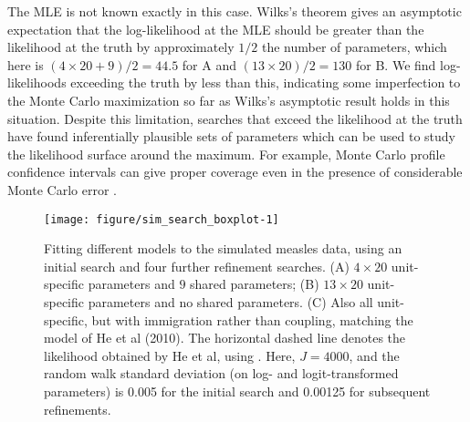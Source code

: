 \documentclass[12pt]{article}\usepackage[]{graphicx}\usepackage[]{xcolor}
\newenvironment{knitrout}{}{} %
\begin{document}
The MLE is not known exactly in this case.
Wilks's theorem gives an asymptotic expectation that the log-likelihood at the MLE should be greater than the likelihood at the truth by approximately $1/2$ the number of parameters, which here is $(4\times 20+9)/2=44.5$ for A and $(13\times 20)/2=130$ for B.
We find log-likelihoods exceeding the truth by less than this, indicating some imperfection to the Monte Carlo maximization so far as Wilks's asymptotic result holds in this situation. 
Despite this limitation, searches that exceed the likelihood at the truth have found inferentially plausible sets of parameters which can be used to study the likelihood surface around the maximum.
For example, Monte Carlo profile confidence intervals can give proper coverage even in the presence of considerable Monte Carlo error \citep{ionides17,ning21}.








\begin{knitrout}
\color{fgcolor}\begin{figure}

\texttt{[image: figure/sim\_search\_boxplot-1]} \hfill{}

\caption[Fitting different models to the simulated measles data, using an initial search and four further refinement searches]{Fitting different models to the simulated measles data, using an initial search and four further refinement searches. (A) $4\times 20$ unit-specific parameters and $9$ shared parameters; (B) $13\times 20$ unit-specific parameters and no shared parameters. (C) Also all unit-specific, but with immigration rather than coupling, matching the model of He et al (2010). The horizontal dashed line denotes the likelihood obtained by He et al, using . Here, $J=4000$, and the random walk standard deviation (on log- and logit-transformed parameters) is 0.005 for the initial search and 0.00125 for subsequent refinements.}\label{fig:sim_search_boxplot}
\end{figure}

\end{knitrout}
\end{document}
